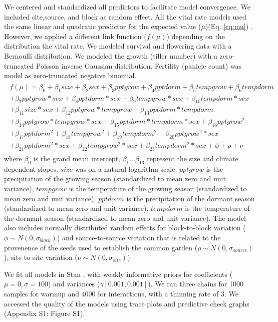 \documentclass[11pt]{article}
\begin{document}
We centered and standardized all predictors to facilitate model convergence.
We included site,source, and block as random effect.
All the vital rate models used the same linear and quadratic predictor for the expected value ($\mu$)(Eq. \ref{eq:mu}) . 
However, we applied a different link function ($f(\mu)$) depending on the distribution the vital rate. 
We modeled survival and flowering data with a Bernoulli distribution.
We modeled the growth (tiller number) with a zero-truncated Poisson inverse Gaussian distribution. 
Fertility (panicle count) was model as zero-truncated negative binomial. 
\begin{align}\label{eq:mu}
\begin{split}
f(\mu) = \beta_{0} + \beta_{1}size + \beta_{2}sex + \beta_{3}pptgrow + \beta_{4}pptdorm + \beta_{5}tempgrow + \beta_{6}tempdorm \\ 
+ \beta_{7}pptgrow*sex + \beta_{8}pptdorm*sex + \beta_{9}tempgrow*sex + \beta_{10}tempdorm*sex  \\ 
+  \beta_{11}size*sex + \beta_{12}pptgrow*tempgrow + \beta_{13}pptdorm*tempdorm\\
+ \beta_{14}pptgrow*tempgrow*sex + \beta_{15}pptdorm*tempdorm*sex + \beta_{16}pptgrow^2\\
+ \beta_{17}pptdorm^2 + \beta_{18}tempgrow^2 + \beta_{19}tempdorm^2 + \beta_{20}pptgrow^2*sex  \\
+ \beta_{21}pptdorm^2*sex + \beta_{22}tempgrow^2*sex + \beta_{23}tempdorm^2*sex + \phi + \rho + \nu 
\end{split}
\end{align}
\noindent where $\beta_{0}$ is the  grand mean intercept, $\beta_{1}$...$\beta_{13}$ represent the size and climate dependent slopes.
$size$ was on a natural logarithm scale. 
$pptgrow$ is the precipitation of the growing season (standardized to mean zero and unit variance), $tempgrow$ is the temperature of the growing season (standardized to mean zero and unit variance), $pptdorm$ is the precipitation of the dormant season (standardized to mean zero and unit variance), $tempdorm$ is the temperature of the dormant season (standardized to mean zero and unit variance).
The model also includes normally distributed random effects for block-to-block variation ($\phi \sim N(0,\sigma_{block})$) and source-to-source variation that is related to the provenence of the seeds used to establish the common garden ($\rho \sim N(0,\sigma_{source})$), site to site variation ($\nu \sim N(0,\sigma_{site})$)


We fit all models in Stan \citep{rstan}, with weakly informative priors for coefficients ($\mu = 0, \sigma = 100$) and variances ($\gamma [0.001, 0.001]$). We ran three chains for 1000 samples for warmup and 4000 for interactions, with a thinning rate of 3.
We accessed the quality of the models using trace plots and predictive check graphs \citep{piironen2017comparison} (Appendix S1: Figure S1).
\end{document}
